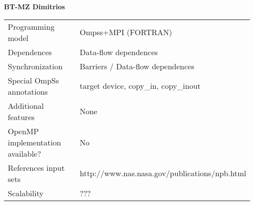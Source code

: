 \section*{}
\label{bt-mz_dimitrios}
\centering
\Huge
\textbf{BT-MZ Dimitrios}

\begin{table}[h!]
  \large
  \centering
  \begin{tabular}{|l|l|}
    \hline
    Programming model                & Ompss+MPI (FORTRAN)\\
    Dependences                      & Data-flow dependences \\
    Synchronization                  & Barriers / Data-flow dependences \\
    Special OmpSs annotations        & target device, copy\_in, copy\_inout\\
    Additional features              & None\\
    OpenMP implementation available? & No \\
    References input sets            & http://www.nas.nasa.gov/publications/npb.html\\
    Scalability                      & ??? \\
    \hline
  \end{tabular}
\end{table}

\newpage
